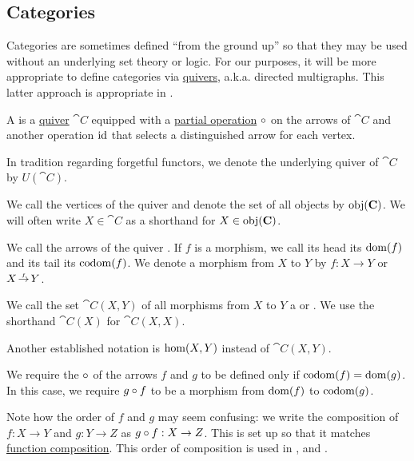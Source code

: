 \subsection{Categories}\label{subsec:categories}

Categories are sometimes defined \enquote{from the ground up} so that they may be used without an underlying set theory or logic. For our purposes, it will be more appropriate to define categories via \hyperref[def:quiver]{quivers}, a.k.a. directed multigraphs. This latter approach is appropriate in \hyperref[def:axiom_of_universes]{}.

\begin{definition}\label{def:category}
  A  is a \hyperref[def:quiver]{quiver} \( \cat{C} \) equipped with a \hyperref[def:partial_function]{partial operation} \( \bincirc \) on the arrows of \( \cat{C} \) and another operation \( \operatorname{id} \) that selects a distinguished arrow for each vertex.

  In tradition regarding forgetful functors, we denote the underlying quiver of \( \cat{C} \) by \( U(\cat{C}) \).

  \begin{thmenum}[series=def:category]
     We call the vertices of the quiver  and denote the set of all objects by \( \operatorname{obj}(\operatorname{\mathbf{C}}) \). We will often write \( X \in \cat{C} \) as a shorthand for \( X \in \operatorname{obj}(\operatorname{\mathbf{C}}) \).

     We call the arrows of the quiver . If \( f \) is a morphism, we call its head its  \( \operatorname{dom}(f) \) and its tail its  \( \operatorname*{co\negthinspace\operatorname{dom}}(f) \). We denote a morphism from \( X \) to \( Y \) by \( f: X \to Y \) or \( X \reloset f \to Y \).

    We call the set \( \cat{C}(X, Y) \) of all morphisms from \( X \) to \( Y \) a  or . We use the shorthand \( \cat{C}(X) \) for \( \cat{C}(X, X) \).

    Another established notation is \( \operatorname{hom}(X, Y) \) instead of \( \cat{C}(X, Y) \).

     We require the  \( \bincirc \) of the arrows \( f \) and \( g \) to be defined only if \( \operatorname*{co\negthinspace\operatorname{dom}}(f) = \operatorname{dom}(g) \). In this case, we require \( g \bincirc f \) to be a morphism from \( \operatorname{dom}(f) \) to \( \operatorname*{co\negthinspace\operatorname{dom}}(g) \).

    Note how the order of \( f \) and \( g \) may seem confusing: we write the composition of \( f: X \to Y \) and \( g: Y \to Z \) as \( g \bincirc f: X \to Z \). This is set up so that it matches \hyperref[def:multi_valued_function/composition]{function composition}. This order of composition is used in \cite[7]{MacLane1994}, \cite[def. 1.1.1]{Leinster2016Basic} and \cite[def 3.1.]{Aluffi2009}.


\end{thmenum}
\end{definition}
